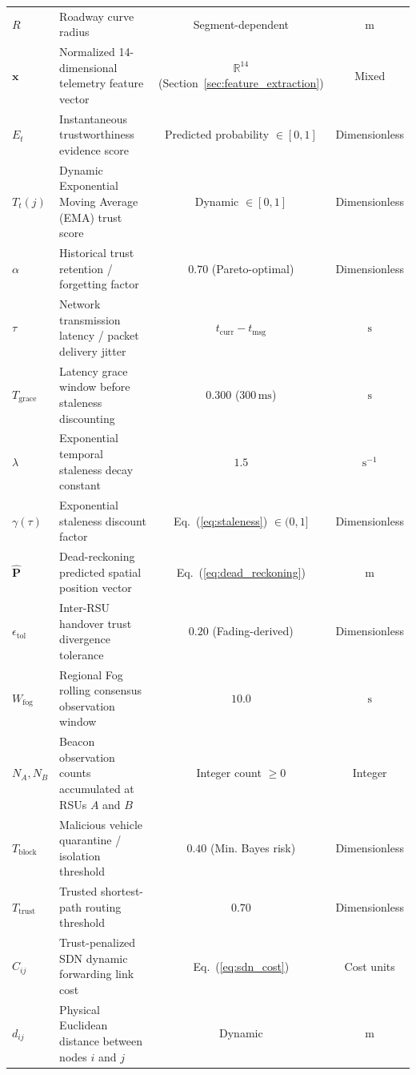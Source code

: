 \documentclass[conference]{IEEEtran}
\begin{document}
\begin{table}[t]
{\begin{tabular}{lp{8.2cm}cc}
$R$ & Roadway curve radius & Segment-dependent & $\text{m}$ \\
$\mathbf{x}$ & Normalized 14-dimensional telemetry feature vector & $\mathbb{R}^{14}$ (Section~\ref{sec:feature_extraction}) & Mixed \\
$E_t$ & Instantaneous trustworthiness evidence score & Predicted probability $\in [0, 1]$ & Dimensionless \\
$T_t(j)$ & Dynamic Exponential Moving Average (EMA) trust score & Dynamic $\in [0, 1]$ & Dimensionless \\
$\alpha$ & Historical trust retention / forgetting factor & $0.70$ (Pareto-optimal) & Dimensionless \\
$\tau$ & Network transmission latency / packet delivery jitter & $t_{\text{curr}} - t_{\text{msg}}$ & $\text{s}$ \\
$T_{\text{grace}}$ & Latency grace window before staleness discounting & $0.300$ ($300\,\text{ms}$) & $\text{s}$ \\
$\lambda$ & Exponential temporal staleness decay constant & $1.5$ & $\text{s}^{-1}$ \\
$\gamma(\tau)$ & Exponential staleness discount factor & Eq.~(\ref{eq:staleness}) $\in (0, 1]$ & Dimensionless \\
$\hat{\mathbf{P}}$ & Dead-reckoning predicted spatial position vector & Eq.~(\ref{eq:dead_reckoning}) & $\text{m}$ \\
$\epsilon_{\text{tol}}$ & Inter-RSU handover trust divergence tolerance & $0.20$ (Fading-derived) & Dimensionless \\
$W_{\text{fog}}$ & Regional Fog rolling consensus observation window & $10.0$ & $\text{s}$ \\
$N_A, N_B$ & Beacon observation counts accumulated at RSUs $A$ and $B$ & Integer count $\ge 0$ & Integer \\
$T_{\text{block}}$ & Malicious vehicle quarantine / isolation threshold & $0.40$ (Min. Bayes risk) & Dimensionless \\
$T_{\text{trust}}$ & Trusted shortest-path routing threshold & $0.70$ & Dimensionless \\
$C_{ij}$ & Trust-penalized SDN dynamic forwarding link cost & Eq.~(\ref{eq:sdn_cost}) & Cost units \\
$d_{ij}$ & Physical Euclidean distance between nodes $i$ and $j$ & Dynamic & $\text{m}$ \\
\bottomrule
\end{tabular}%
}
\end{table}
\end{document}
